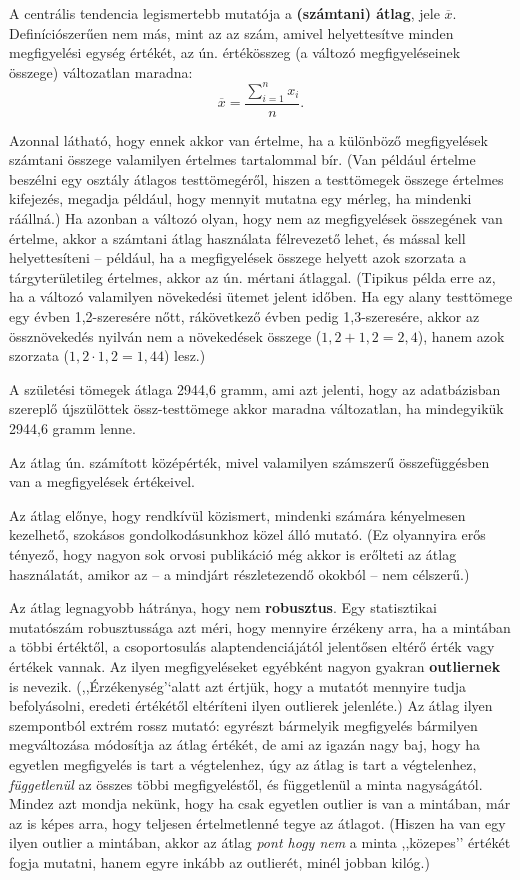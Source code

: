 \documentclass[]{book}
\begin{document}
A centrális tendencia legismertebb mutatója a \textbf{(számtani) átlag},
jele \(\overline{x}\). Definíciószerűen nem más, mint az az szám, amivel
helyettesítve minden megfigyelési egység értékét, az ún. értékösszeg (a
változó megfigyeléseinek összege) változatlan maradna: \[
    \overline{x}=\frac{\sum_{i=1}^n x_i}{n}.
\]

Azonnal látható, hogy ennek akkor van értelme, ha a különböző
megfigyelések számtani összege valamilyen értelmes tartalommal bír. (Van
például értelme beszélni egy osztály átlagos testtömegéről, hiszen a
testtömegek összege értelmes kifejezés, megadja például, hogy mennyit
mutatna egy mérleg, ha mindenki ráállná.) Ha azonban a változó olyan,
hogy nem az megfigyelések összegének van értelme, akkor a számtani átlag
használata félrevezető lehet, és mással kell helyettesíteni -- például,
ha a megfigyelések összege helyett azok szorzata a tárgyterületileg
értelmes, akkor az ún. mértani átlaggal. (Tipikus példa erre az, ha a
változó valamilyen növekedési ütemet jelent időben. Ha egy alany
testtömege egy évben 1,2-szeresére nőtt, rákövetkező évben pedig
1,3-szeresére, akkor az össznövekedés nyilván nem a növekedések összege
(\(1,\!2 + 1,\!2 = 2,\!4\)), hanem azok szorzata
(\(1,\!2 \cdot 1,\!2 = 1,\!44\)) lesz.)

A születési tömegek átlaga 2944,6 gramm, ami azt jelenti, hogy az
adatbázisban szereplő újszülöttek össz-testtömege akkor maradna
változatlan, ha mindegyikük 2944,6 gramm lenne.

Az átlag ún. számított középérték, mivel valamilyen számszerű
összefüggésben van a megfigyelések értékeivel.

Az átlag előnye, hogy rendkívül közismert, mindenki számára kényelmesen
kezelhető, szokásos gondolkodásunkhoz közel álló mutató. (Ez olyannyira
erős tényező, hogy nagyon sok orvosi publikáció még akkor is erőlteti az
átlag használatát, amikor az -- a mindjárt részletezendő okokból -- nem
célszerű.)

Az átlag legnagyobb hátránya, hogy nem \textbf{robusztus}. Egy
statisztikai mutatószám robusztussága azt méri, hogy mennyire érzékeny
arra, ha a mintában a többi értéktől, a csoportosulás alaptendenciájától
jelentősen eltérő érték vagy értékek vannak. Az ilyen megfigyeléseket
egyébként nagyon gyakran \textbf{outliernek} is nevezik.
(,,Érzékenység'`alatt azt értjük, hogy a mutatót mennyire tudja
befolyásolni, eredeti értékétől eltéríteni ilyen outlierek jelenléte.)
Az átlag ilyen szempontból extrém rossz mutató: egyrészt bármelyik
megfigyelés bármilyen megváltozása módosítja az átlag értékét, de ami az
igazán nagy baj, hogy ha egyetlen megfigyelés is tart a végtelenhez, úgy
az átlag is tart a végtelenhez, \emph{függetlenül} az összes többi
megfigyeléstől, és függetlenül a minta nagyságától. Mindez azt mondja
nekünk, hogy ha csak egyetlen outlier is van a mintában, már az is képes
arra, hogy teljesen értelmetlenné tegye az átlagot. (Hiszen ha van egy
ilyen outlier a mintában, akkor az átlag \emph{pont hogy nem} a minta
,,közepes'' értékét fogja mutatni, hanem egyre inkább az outlierét,
minél jobban kilóg.)
\end{document}
